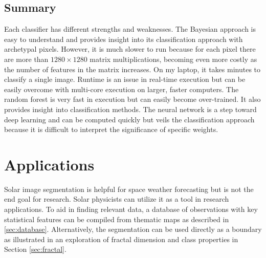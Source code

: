 \documentclass[twoside]{report}
\begin{document}
\section{Summary} 
Each classifier has different strengths and weaknesses. The Bayesian approach is easy to understand and provides insight into its classification approach with archetypal pixels. However, it is much slower to run because for each pixel there are more than $1280 \times 1280$ matrix multiplications, becoming even more costly as the number of features in the matrix increases. On my laptop, it takes minutes to classify a single image. Runtime is an issue in real-time execution but can be easily overcome with multi-core execution on larger, faster computers. The random forest is very fast in execution but can easily become over-trained. It also provides insight into classification methods. The neural network is a step toward deep learning and can be computed quickly but veils the classification approach because it is difficult to interpret the significance of specific weights. 

\chapter{Applications} \label{ch:application}
Solar image segmentation is helpful for space weather forecasting but is not the end goal for research. Solar physicists can utilize it as a tool in research applications. To aid in finding relevant data, a database of observations with key statistical features can be compiled from thematic maps as described in \ref{sec:database}. Alternatively, the segmentation can be used directly as a boundary as illustrated in an exploration of fractal dimension and class properties in Section \ref{sec:fractal}. 
\end{document}
